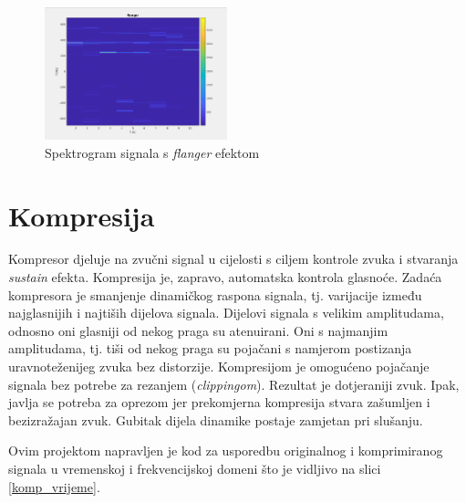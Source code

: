 \documentclass[conference]{IEEEtran}
\begin{document}
\begin{figure}[h]
    \includegraphics[width=200]{slike/flanger_spektar.png}
    \centering
    \caption{Spektrogram signala s \textit{flanger} efektom}							%
    \label{flang_spektar}
\end{figure}

\section{Kompresija}

Kompresor djeluje na zvučni signal u cijelosti s ciljem kontrole zvuka i stvaranja \textit{sustain}
efekta. Kompresija je, zapravo, automatska kontrola glasnoće. Zadaća kompresora je smanjenje
dinamičkog raspona signala, tj. varijacije između najglasnijih i najtiših dijelova signala.
Dijelovi signala s velikim amplitudama, odnosno oni glasniji od nekog praga su atenuirani. Oni s
najmanjim amplitudama, tj. tiši od nekog praga su pojačani s namjerom postizanja uravnoteženijeg zvuka
bez distorzije. Kompresijom je omogućeno pojačanje signala bez potrebe za rezanjem (\textit{clippingom}).
Rezultat je dotjeraniji zvuk. Ipak, javlja se potreba za oprezom jer prekomjerna kompresija stvara
zašumljen i bezizražajan zvuk. Gubitak dijela dinamike postaje zamjetan pri slušanju.

Ovim projektom napravljen je kod za usporedbu originalnog i komprimiranog signala u vremenskoj i
frekvencijskoj domeni što je vidljivo na slici \ref{komp_vrijeme}.
\end{document}
